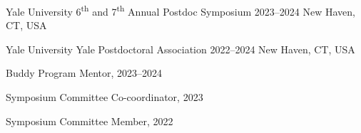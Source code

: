 
\begin{cventries}
  \cventry
    {Yale University} %
    {6\textsuperscript{th} and 7\textsuperscript{th} Annual Postdoc Symposium} %
    {2023--2024} %
    {New Haven, CT, USA} %
    {}
\end{cventries}


\begin{cventries}


  \cventry
    {Yale University} %
    {Yale Postdoctoral Association} %
    {2022--2024} %
    {New Haven, CT, USA} %
    {
      \begin{cvitems}
        \item Buddy Program Mentor, 2023--2024
        \item Symposium Committee Co-coordinator, 2023
        \item Symposium Committee Member, 2022 
      \end{cvitems}
    }

    

\end{cventries}
